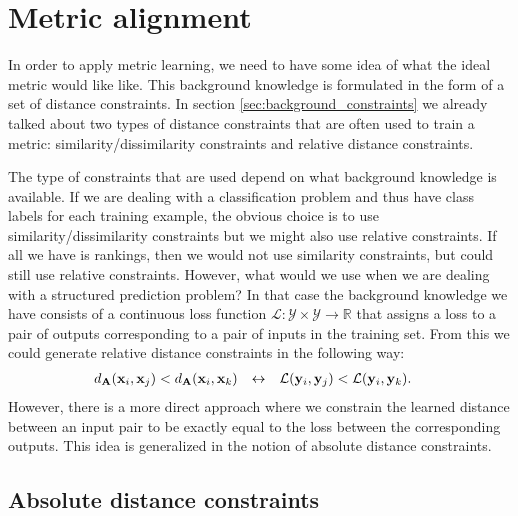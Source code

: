 \section{Metric alignment}






In order to apply metric learning, we need to have some idea of what the ideal metric would like like. This background knowledge is formulated in the form of a set of distance constraints. In section \ref{sec:background_constraints} we already talked about two types of distance constraints that are often used to train a metric: similarity/dissimilarity constraints and relative distance constraints.

The type of constraints that are used depend on what background knowledge is available. If we are dealing with a classification problem and thus have class labels for each training example, the obvious choice is to use similarity/dissimilarity constraints but we might also use relative constraints. If all we have is rankings, then we would not use similarity constraints, but could still use relative constraints. However, what would we use when we are dealing with a structured prediction problem? In that case the background knowledge we have consists of a continuous loss function $\mathcal{L}: \mathcal{Y} \times \mathcal{Y} \rightarrow \mathbb{R}$ that assigns a loss to a pair of outputs corresponding to a pair of inputs in the training set. From this we could generate relative distance constraints in the following way:
\begin{align}
d_{\mathbf{A}}(\mathbf{x}_i, \mathbf{x}_j) &< d_{\mathbf{A}}(\mathbf{x}_i, \mathbf{x}_k) &\leftrightarrow&&\mathcal{L}(\mathbf{y}_i, \mathbf{y}_j) &< \mathcal{L}(\mathbf{y}_i, \mathbf{y}_k).
\end{align}
However, there is a more direct approach where we constrain the learned distance between an input pair to be exactly equal to the loss between the corresponding outputs. This idea is generalized in the notion of absolute distance constraints.



\subsection{Absolute distance constraints}

